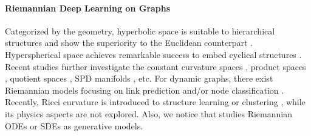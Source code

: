 \paragraph{Riemannian Deep Learning on Graphs}
Categorized by the geometry, 
hyperbolic space is suitable to hierarchical structures and show the superiority to the Euclidean counterpart \cite{icml24sun,fu24icml,aaai24YCWei}.
Hyperspherical space achieves remarkable success to embed cyclical structures \cite{icml23sphereFourier}.
Recent studies further investigate the constant curvature spaces \cite{icml20kGCN,nips24sun}, product spaces \cite{iclr19Gu,aaai22sunli,aaai24sunli}, quotient spaces \cite{nips22QGCN}, SPD manifolds \cite{icml23GyroSpace}, etc. 
For dynamic graphs, there exist Riemannian models focusing on link prediction and/or node classification \cite{kdd21yang,aaai21sunli,cikm22sunli,aaai23sunli}.
Recently, Ricci curvature is introduced to structure learning \cite{icml23revisitRicci,icdm23sunli} or clustering \cite{ijcai23sunli}, while its physics aspects are not explored.
Also, we notice that \citet{nips20mainfoldode,www24sunli,sigir24sunli,WangSun24cikm,iclr24FlowMatch} studies Riemannian ODEs or SDEs as generative models.

